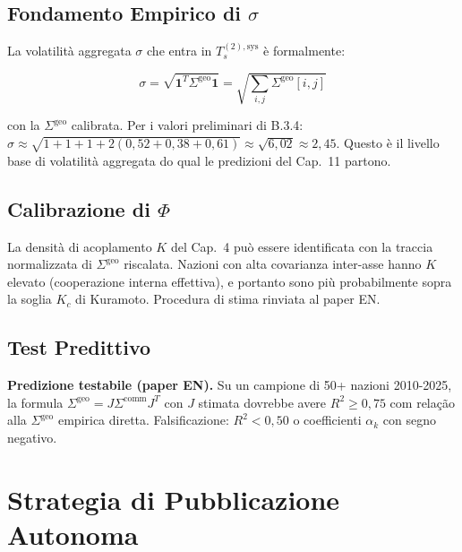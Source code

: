 \subsection{\texorpdfstring{Fondamento Empirico di
\(\sigma\)}{Fondamento Empirico di \textbackslash sigma}}\label{fondamento-empirico-di-sigma}

La volatilità aggregata \(\sigma\) che entra in \(T_s^{(2),\text{sys}}\)
è formalmente:

\[
\sigma = \sqrt{\boldsymbol{1}^T \Sigma^{\text{geo}} \boldsymbol{1}} = \sqrt{\sum_{i,j} \Sigma^{\text{geo}}[i,j]}
\]

con la \(\Sigma^{\text{geo}}\) calibrata. Per i valori preliminari di
B.3.4:
\(\hat\sigma \approx \sqrt{1+1+1+2(0{,}52+0{,}38+0{,}61)} \approx \sqrt{6{,}02} \approx 2{,}45\).
Questo è il livello base di volatilità aggregata do qual le predizioni
del Cap.~11 partono.

\subsection{\texorpdfstring{Calibrazione di
\(\Phi\)}{Calibrazione di \textbackslash Phi}}\label{calibrazione-di-phi}

\Hypoth{} La densità di acoplamento \(K\) del Cap.~4 può essere
identificata con la traccia normalizzata di \(\Sigma^{\text{geo}}\)
riscalata. Nazioni con alta covarianza inter-asse hanno \(K\) elevato
(cooperazione interna effettiva), e portanto sono più probabilmente sopra
la soglia \(K_c\) di Kuramoto. Procedura di stima rinviata al paper EN.

\subsection{Test Predittivo}\label{test-predittivo}

\Conj{} \textbf{Predizione testabile (paper EN).} Su un campione di 50+
nazioni 2010-2025, la formula
\(\Sigma^{\text{geo}} = J \Sigma^{\text{comm}} J^T\) con \(J\) stimata
dovrebbe avere \(R^2 \geq 0{,}75\) com relação alla \(\Sigma^{\text{geo}}\)
empirica diretta. Falsificazione: \(R^2 < 0{,}50\) o coefficienti
\(\alpha_k\) con segno negativo.



\section{Strategia di Pubblicazione
Autonoma}\label{strategia-di-pubblicazione-autonoma}

